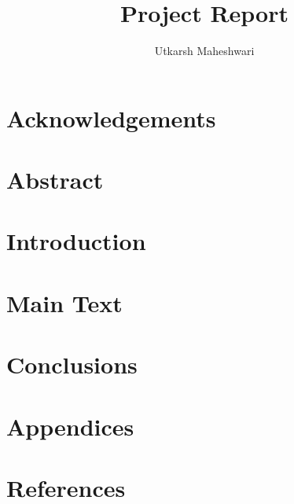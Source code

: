 \documentclass[12pt, a4paper, oneside, titlepage]{report}
\title{Project Report}
\author{Utkarsh Maheshwari}
\begin{document}
\makecover

\maketitle

\chapter{Acknowledgements}


\chapter{Abstract}


\tableofcontents

\chapter{Introduction}


\chapter{Main Text}


\chapter{Conclusions}


\chapter{Appendices}


\chapter{References}


\printglossaries
\end{document}

